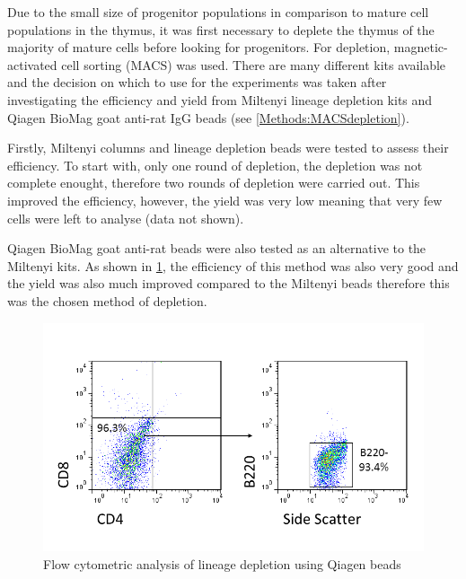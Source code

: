 
Due to the small size of progenitor populations in comparison to mature cell populations in the thymus, it was first necessary to deplete the thymus of the majority of mature cells before looking for progenitors.
For depletion, magnetic-activated cell sorting (MACS) was used.
There are many different kits available and the decision on which to use for the experiments was taken after investigating the efficiency and yield from Miltenyi lineage depletion kits and Qiagen BioMag goat anti-rat IgG beads (see \cref{Methods:MACSdepletion}).

Firstly, Miltenyi columns and lineage depletion beads were tested to assess their efficiency.
To start with, only one round of depletion, the depletion was not complete enought, therefore two rounds of depletion were carried out.
This improved the efficiency, however, the yield was very low meaning that very few cells were left to analyse (data not shown).

Qiagen BioMag goat anti-rat beads were also tested as an alternative to the Miltenyi kits. 
As shown in \cref{fig:Qiagenbeads}, the efficiency of this method was also very good and the yield was also much improved compared to the Miltenyi beads therefore this was the chosen method of depletion.

\begin{figure}
\includegraphics[width=\textwidth]{Figures/Qiagenbeads.png}
\caption{Flow cytometric analysis of lineage depletion using Qiagen beads}
\label{fig:Qiagenbeads}
\end{figure}

